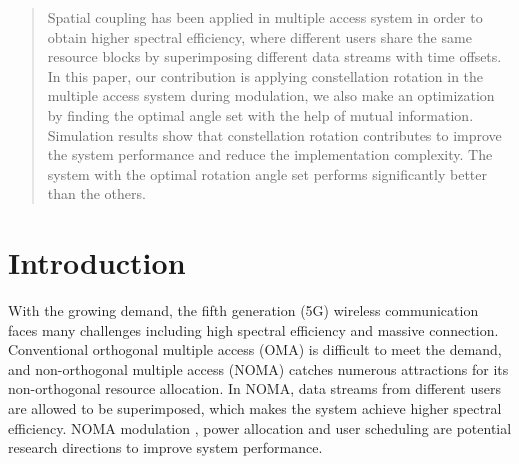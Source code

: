 \documentclass[conference]{IEEEtran}
\begin{document}
\maketitle

\begin{abstract}
Spatial coupling has been applied in multiple access system in order to obtain higher spectral efficiency, where different users share the same resource blocks by superimposing different data streams with time offsets. In this paper, our contribution is applying constellation rotation in the multiple access system during modulation, we also make an optimization by finding the optimal angle set with the help of mutual information. Simulation results show that constellation rotation contributes to improve the system performance and reduce the implementation complexity. The system with the optimal rotation angle set performs significantly better than the others.
\end{abstract}





%
\IEEEpeerreviewmaketitle



\section{Introduction}

With the growing demand, the fifth generation (5G) wireless communication faces many challenges including high spectral efficiency and massive connection. Conventional orthogonal multiple access (OMA) is difficult to meet the demand, and non-orthogonal multiple access (NOMA) \cite{1} catches numerous attractions for its non-orthogonal resource allocation. In NOMA, data streams from different users are allowed to be superimposed, which makes the system achieve higher spectral efficiency. NOMA modulation \cite{2}, power allocation and user scheduling \cite{3} are potential research directions to improve system performance.
\end{document}
